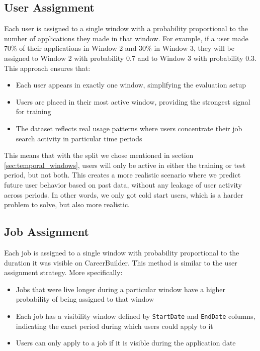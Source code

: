 \subsection{User Assignment}

Each user is assigned to a single window with a probability proportional to the number of applications they made in that window. For example, if a user made 70\% of their applications in Window 2 and 30\% in Window 3, they will be assigned to Window 2 with probability 0.7 and to Window 3 with probability 0.3. This approach ensures that:
\begin{itemize}
    \item Each user appears in exactly one window, simplifying the evaluation setup
    \item Users are placed in their most active window, providing the strongest signal for training
    \item The dataset reflects real usage patterns where users concentrate their job search activity in particular time periods
\end{itemize}

This means that with the split we chose mentioned in section \ref{sec:temporal_windows}, users will only be active in either the training or test period, but not both. This creates a more realistic scenario where we predict future user behavior based on past data, without any leakage of user activity across periods. In other words, we only got cold start users, which is a harder problem to solve, but also more realistic.

\subsection{Job Assignment}

Each job is assigned to a single window with probability proportional to the duration it was visible on CareerBuilder. This method is similar to the user assignment strategy. More specifically:
\begin{itemize}
    \item Jobs that were live longer during a particular window have a higher probability of being assigned to that window
    \item Each job has a visibility window defined by \texttt{StartDate} and \texttt{EndDate} columns, indicating the exact period during which users could apply to it
    \item Users can only apply to a job if it is visible during the application date
\end{itemize}

